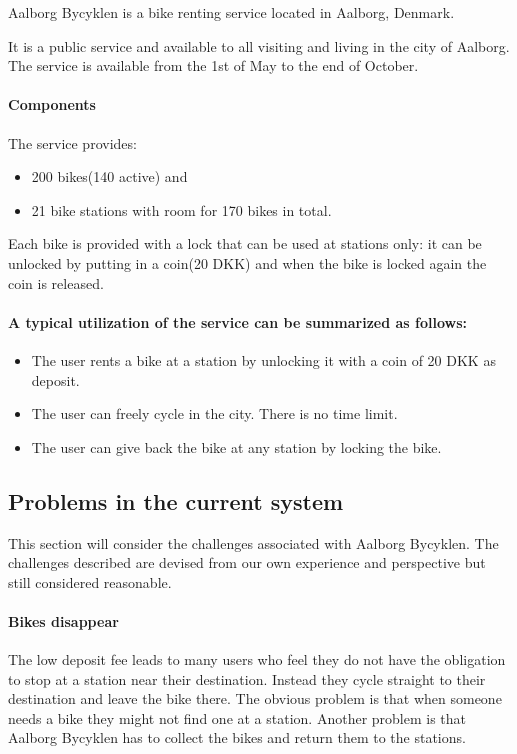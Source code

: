 \label{aalborg_bycyklen}
Aalborg Bycyklen is a bike renting service located in Aalborg, Denmark.

It is a public service and available to all visiting and living in the city of Aalborg.
The service is available from the 1st of May to the end of October.\cite{aalborgbycyklenbagcyklen}

\paragraph{Components}
The service provides:
\begin{itemize}
\item 200 bikes(140 active) and 
\item 21 bike stations with room for 170 bikes in total.
\end{itemize}
Each bike is provided with a lock that can be used at stations only:
it can be unlocked by putting in a coin(20 DKK) and when the bike is locked again the coin is released.

\paragraph{A typical utilization of the service can be summarized as follows:}
\begin{itemize}
\item The user rents a bike at a station by unlocking it with a coin of 20 DKK as deposit.
\item The user can freely cycle in the city. There is no time limit.
\item The user can give back the bike at any station by locking the bike.
\end{itemize}

\subsection{Problems in the current system}\label{aalborg_bycyklen:challenges}
This section will consider the challenges associated with Aalborg Bycyklen.
The challenges described are devised from our own experience and perspective but still considered reasonable.

\paragraph{Bikes disappear}
The low deposit fee leads to many users who feel they do not have the obligation to stop at a station near their destination.
Instead they cycle straight to their destination and leave the bike there.
The obvious problem is that when someone needs a bike they might not find one at a station.
Another problem is that Aalborg Bycyklen has to collect the bikes and return them to the stations.

